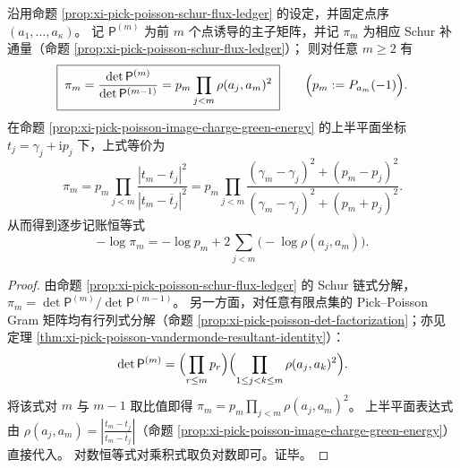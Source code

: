 \begin{corollary}\label{cor:xi-pick-poisson-schur-flux-closed-form}
沿用命题 \ref{prop:xi-pick-poisson-schur-flux-ledger} 的设定，并固定点序 \((a_1,\dots,a_\kappa)\)。
记 \(\mathsf P^{(m)}\) 为前 \(m\) 个点诱导的主子矩阵，并记 \(\pi_m\) 为相应 Schur 补通量（命题 \ref{prop:xi-pick-poisson-schur-flux-ledger}）；
则对任意 \(m\ge 2\) 有
\[
\boxed{\;
\pi_m=\frac{\det\mathsf P^{(m)}}{\det\mathsf P^{(m-1)}}
=p_m\prod_{j<m}\rho(a_j,a_m)^2\;}
\qquad\Bigl(p_m:=P_{a_m}(-1)\Bigr).
\]
在命题 \ref{prop:xi-pick-poisson-image-charge-green-energy} 的上半平面坐标 \(t_j=\gamma_j+\mathrm{i}p_j\) 下，上式等价为
\[
\pi_m
=p_m\prod_{j<m}\frac{|t_m-t_j|^2}{|t_m-\overline t_j|^2}
=p_m\prod_{j<m}
\frac{(\gamma_m-\gamma_j)^2+(p_m-p_j)^2}{(\gamma_m-\gamma_j)^2+(p_m+p_j)^2}.
\]
从而得到逐步记账恒等式
\[
-\log\pi_m
=-\log p_m
+2\sum_{j<m}\bigl(-\log\rho(a_j,a_m)\bigr).
\]
\end{corollary}
\begin{proof}
由命题 \ref{prop:xi-pick-poisson-schur-flux-ledger} 的 Schur 链式分解，\(\pi_m=\det\mathsf P^{(m)}/\det\mathsf P^{(m-1)}\)。
另一方面，对任意有限点集的 Pick--Poisson Gram 矩阵均有行列式分解（命题 \ref{prop:xi-pick-poisson-det-factorization}；亦见定理 \ref{thm:xi-pick-poisson-vandermonde-resultant-identity}）：
\[
\det\mathsf P^{(m)}
=\Bigl(\prod_{r\le m}p_r\Bigr)\Bigl(\prod_{1\le j<k\le m}\rho(a_j,a_k)^2\Bigr).
\]
将该式对 \(m\) 与 \(m-1\) 取比值即得
\(
\pi_m=p_m\prod_{j<m}\rho(a_j,a_m)^2
\)。
上半平面表达式由 \(\rho(a_j,a_m)=\left|\frac{t_m-t_j}{t_m-\overline t_j}\right|\)（命题 \ref{prop:xi-pick-poisson-image-charge-green-energy}）直接代入。
对数恒等式对乘积式取负对数即可。证毕。
\end{proof}

\endinput

